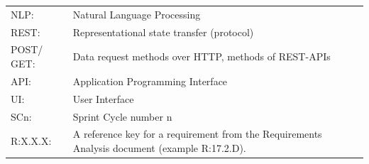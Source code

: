 \documentclass[9pt, titlepage]{extarticle}
\begin{document}
\begin{tabularx}{\linewidth}{ l X }
    {NLP:}     & Natural Language Processing\\
    {REST:}     & Representational state transfer (protocol)\\
    {POST/ GET:} & Data request methods over HTTP, methods of REST-APIs\\
    {API:}     & Application Programming Interface\\
    {UI:}      & User Interface\\
    {SCn:}      & Sprint Cycle number n\\
    {R:X.X.X:}      & A reference key for a requirement from the Requirements Analysis document (example R:17.2.D).\\
\end{tabularx}
\end{document}
